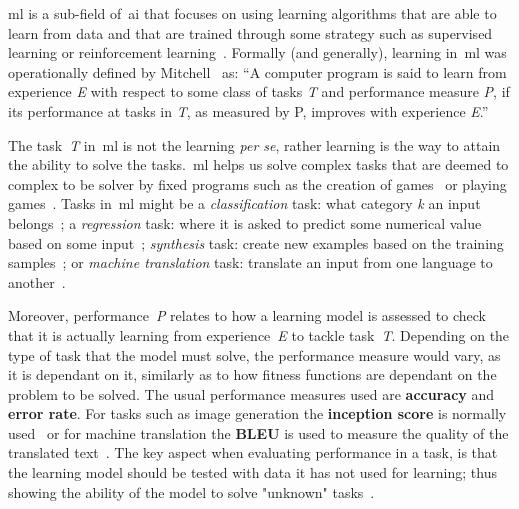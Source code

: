 \acrfull{ml} is a sub-field of~\acrshort{ai} that focuses on using learning algorithms that are able to learn from data and that are trained through some strategy such as supervised learning or reinforcement learning~\cite{Goodfellow2016-DeepLearning}. Formally (and generally), learning in~\acrshort{ml} was operationally defined by Mitchell~\cite{Mitchell97-ML} as: “A computer program is said to learn from experience \textit{E} with respect to some class of tasks \textit{T} and performance measure \textit{P}, if its performance at tasks in \textit{T}, as measured by P, improves with experience \textit{E}.” 

The task~\textit{T} in~\acrshort{ml} is not the learning \textit{per se}, rather learning is the way to attain the ability to solve the tasks.~\acrshort{ml} helps us solve complex tasks that are deemed to complex to be solver by fixed programs such as the creation of games~\cite{summerville2018procedural} or playing games~\cite{Mnih2015-AtariDeepRL,Justesen2020-DLGamePlaying}. Tasks in~\acrshort{ml} might be a \emph{classification} task: what category \textit{k} an input belongs~\cite{Clanuwat2019-Kuronet}; a \emph{regression} task: where it is asked to predict some numerical value based on some input~\cite{regressiontask}; \emph{synthesis} task: create new examples based on the training samples~\cite{torrado2019-bootstrappingGAN}; or \emph{machine translation} task: translate an input from one language to another~\cite{Hartmann2019-UnsupervisedWordTranslation}.

Moreover, performance~\textit{P} relates to how a learning model is assessed to check that it is actually learning from experience~\textit{E} to tackle task~\textit{T}. Depending on the type of task that the model must solve, the performance measure would vary, as it is dependant on it, similarly as to how fitness functions are dependant on the problem to be solved. The usual performance measures used are \textbf{accuracy} and \textbf{error rate}. For tasks such as image generation the \textbf{inception score} is normally used~\cite{Salimans2016-InceptionScore} or for machine translation the \textbf{BLEU} is used to measure the quality of the translated text~\cite{Papineni2002-BLEU}. The key aspect when evaluating performance in a task, is that the learning model should be tested with data it has not used for learning; thus showing the ability of the model to solve "unknown" tasks~\cite{Goodfellow2016-DeepLearning}. 

